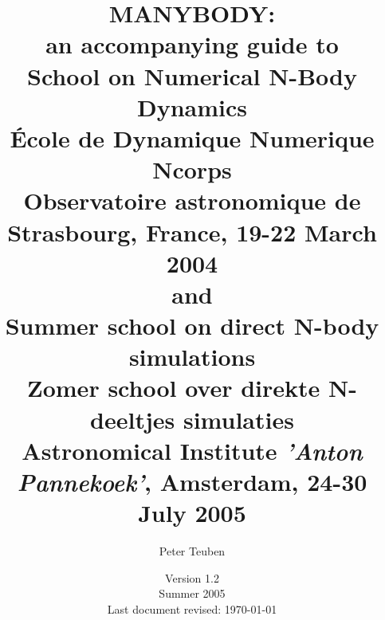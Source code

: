 

\nonstopmode			%

\documentclass[headsepline,normalheadings]{book}



\usepackage{epsfig}
\usepackage{html}
\usepackage{nemo}

\title{ {\Huge MANYBODY:} \\
           {\LARGE an accompanying guide to }\\
	   { \bf School on Numerical N-Body Dynamics }\\
	   { \bf \'Ecole de Dynamique Numerique Ncorps }\\
{ Observatoire astronomique de Strasbourg, France, 19-22 March 2004}\\
	   and\\
	   {\bf  Summer school on direct N-body simulations} \\
	   {\bf  Zomer school over direkte N-deeltjes simulaties} \\
	   { Astronomical Institute {\it 'Anton Pannekoek'}, Amsterdam, 24-30 July 2005}
}


\author{
 {Peter Teuben } \\
       }

\date{{\small Version 1.2} \\
      {\small Summer 2005} \\
      {\small Last document revised: \today} \\ \\
     }

\def\eps@scaling{1.0}%
\newcommand\epsscale[1]{\gdef\eps@scaling{#1}}%
\newcommand\plotone[1]{%
 \typeout{Plotone included the file #1}
 \centering
 \leavevmode
 \texttt{[image: \#1]}%
}%

\newcommand\plottwo[2]{{%
 \typeout{Plottwo included the files #1 #2}
 \centering
 \leavevmode
 \columnwidth=.45\columnwidth
 \texttt{[image: \#1]}%
 \hfil
 \texttt{[image: \#2]}%
}}%


